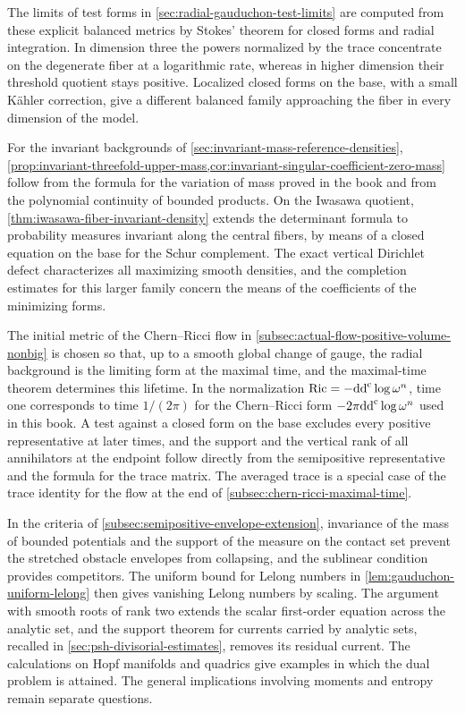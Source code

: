 The limits of test forms in \cref{sec:radial-gauduchon-test-limits} are computed from these explicit balanced metrics by Stokes' theorem for closed forms and radial integration. In dimension three the powers normalized by the trace concentrate on the degenerate fiber at a logarithmic rate, whereas in higher dimension their threshold quotient stays positive. Localized closed forms on the base, with a small K\"ahler correction, give a different balanced family approaching the fiber in every dimension of the model.

For the invariant backgrounds of \cref{sec:invariant-mass-reference-densities}, \cref{prop:invariant-threefold-upper-mass,cor:invariant-singular-coefficient-zero-mass} follow from the formula for the variation of mass proved in the book and from the polynomial continuity of bounded products. On the Iwasawa quotient, \cref{thm:iwasawa-fiber-invariant-density} extends the determinant formula to probability measures invariant along the central fibers, by means of a closed equation on the base for the Schur complement. The exact vertical Dirichlet defect characterizes all maximizing smooth densities, and the completion estimates for this larger family concern the means of the coefficients of the minimizing forms.

The initial metric of the Chern--Ricci flow in \cref{subsec:actual-flow-positive-volume-nonbig} is chosen so that, up to a smooth global change of gauge, the radial background is the limiting form at the maximal time, and the maximal-time theorem determines this lifetime. In the normalization $\operatorname{Ric}=-\mathrm{dd}^{\mathrm{c}}\log\omega^n$, time one corresponds to time $1/(2\pi)$ for the Chern--Ricci form $-2\pi\mathrm{dd}^{\mathrm{c}}\log\omega^n$ used in this book. A test against a closed form on the base excludes every positive representative at later times, and the support and the vertical rank of all annihilators at the endpoint follow directly from the semipositive representative and the formula for the trace matrix. The averaged trace is a special case of the trace identity for the flow at the end of \cref{subsec:chern-ricci-maximal-time}.

In the criteria of \cref{subsec:semipositive-envelope-extension}, invariance of the mass of bounded potentials and the support of the measure on the contact set prevent the stretched obstacle envelopes from collapsing, and the sublinear condition provides competitors. The uniform bound for Lelong numbers in \cref{lem:gauduchon-uniform-lelong} then gives vanishing Lelong numbers by scaling. The argument with smooth roots of rank two extends the scalar first-order equation across the analytic set, and the support theorem for currents carried by analytic sets, recalled in \cref{sec:psh-divisorial-estimates}, removes its residual current. The calculations on Hopf manifolds and quadrics give examples in which the dual problem is attained. The general implications involving moments and entropy remain separate questions.

